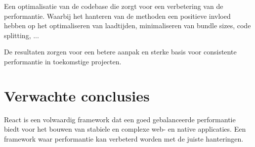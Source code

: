 \documentclass[fleqn,10pt]{voorstel}
\begin{document}
Een optimalisatie van de codebase die zorgt voor een verbetering van de performantie. Waarbij het hanteren van de methoden een positieve invloed hebben op het optimaliseren van laadtijden, minimaliseren van bundle sizes, code splitting, ...

De resultaten zorgen voor een betere aanpak en sterke basis voor consistente performantie in toekomstige projecten.

\section{Verwachte conclusies}

React is een volwaardig framework dat een goed gebalanceerde performantie biedt voor het bouwen van stabiele en complexe web- en native applicaties. Een framework waar performantie kan verbeterd worden met de juiste hanteringen.


\printbibliography[heading=bibintoc]
\end{document}
